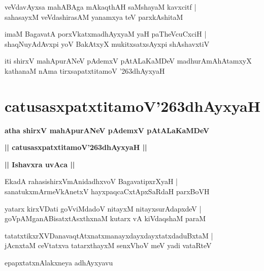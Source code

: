 \documentclass[twoside,12pt,openright]{book}
\def\S{\char'263}
\newcounter{shloka}[chapter]
\def\uvaca#1{\centerline{{\large\textbf{#1}}}}
\begin{document}
\begin{shloka}%
veVdavAyxsa mahABAga mAkaqthAH saMshayaM kavxcitf |\\
sahasayxM veVdashirasAM yanamxya teV parxkAshitaM 
\end{shloka}

\begin{shloka}%
imaM BagavatA porxVkatxmadhAyxyaM yaH paTheVcuCxciH |\\
shaqNuyAdAvxpi yoV BakAtxyX mukitxsatxsAyxpi shAshavxtiV 
\end{shloka}

\begin{center}
iti shirxV mahApurANeV pAdemxV pAtALaKaMDeV madhurAmAhAtamxyX kathanaM nAma   
tirxsapatxtitamoV \S dhAyxyaH
\end{center}

\chapter{catusasxpatxtitamoV\S dhAyxyaH}

\begin{center}
{\LARGE\bfseries atha shirxV mahApurANeV pAdemxV pAtALaKaMDeV }
\end{center}

\begin{center}         
{\LARGE\bfseries || catusasxpatxtitamoV\S dhAyxyaH ||}
\end{center}

\uvaca{|| Ishavxra uvAca ||}

\begin{shloka}%
EkadA rahasishirxVmAnidadhxvoV BagavatipxrXyaH |\\
sanatukxmArmeVkAnetxV hayxpaqcaCxtApxSaRdaH parxBoVH
\end{shloka}

\begin{shloka}%
yatarx kirxVDati goVviMdadoV nitayxM nitayxsurAdapxdeV |\\
goVpAMganABisatxtAsxthxnaM kutarx vA kiVdaqshaM paraM 
\end{shloka}

\begin{shloka}%
tatatxtikxrXVDanavaqtAtxnatxmanayxdayxdayxtatxdaduBxtaM |\\
jAcnxtaM ceVtatxva tatarxthayxM senxVhoV meV yadi vataRteV 
\end{shloka}

\begin{center}
epapxtatxnAlakxneya adhAyxyavu
\end{center}
\end{document}
